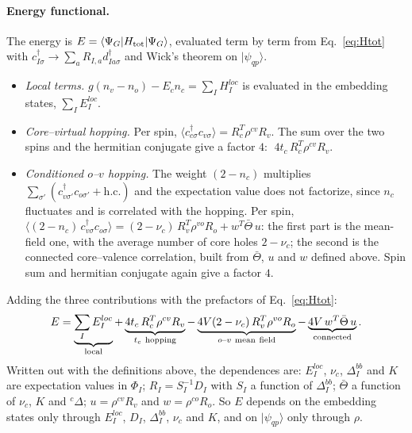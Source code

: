 \documentclass[11pt]{article}
\newcommand{\dg}{^{\dagger}}
\newcommand{\ket}[1]{|#1\rangle}
\newcommand{\braket}[1]{\langle #1\rangle}
\begin{document}
\paragraph{Energy functional.} The energy is $E=\braket{\Psi_G|H_{\rm tot}|\Psi_G}$, evaluated term by term from Eq.~\eqref{eq:Htot}
with $c\dg_{I\sigma}\to\sum_aR_{I,a}d\dg_{Ia\sigma}$ and Wick's theorem on $\ket{\psi_{qp}}$.
\begin{itemize}
\item \emph{Local terms.} $g(n_v-n_o)-E_cn_c=\sum_IH^{loc}_I$ is evaluated in the embedding states, $\sum_IE^{loc}_I$.
\item \emph{Core--virtual hopping.} Per spin, $\braket{c\dg_{c\sigma}c_{v\sigma}}=R_c^T\rho^{cv}R_v$. The sum over the two spins and the
hermitian conjugate give a factor $4$: $\;4t_c\,R_c^T\rho^{cv}R_v$.
\item \emph{Conditioned $o$--$v$ hopping.} The weight $(2-n_c)$ multiplies $\sum_{\sigma'}(c\dg_{v\sigma'}c_{o\sigma'}+\mathrm{h.c.})$ and the expectation
value does not factorize, since $n_c$ fluctuates and is correlated with the hopping. Per spin,
$\braket{(2-n_c)\,c\dg_{v\sigma}c_{o\sigma}}=(2-\nu_c)\,R_v^T\rho^{vo}R_o+w^T\bar\Theta\,u$: the first part is the mean-field one, with the average
number of core holes $2-\nu_c$; the second is the connected core--valence correlation, built from $\bar\Theta$, $u$ and $w$ defined above.
Spin sum and hermitian conjugate again give a factor $4$.
\end{itemize}
Adding the three contributions with the prefactors of Eq.~\eqref{eq:Htot}:
\begin{equation}
E=\underbrace{\sum_IE^{loc}_I}_{\rm local}+\underbrace{4t_c\,R_c^T\rho^{cv}R_v}_{t_c\ \rm hopping}
-\underbrace{4V(2-\nu_c)\,R_v^T\rho^{vo}R_o}_{o\text{--}v\ \rm mean\ field}-\underbrace{4V\,w^T\bar\Theta\,u}_{\rm connected}.
\label{eq:E}
\end{equation}
Written out with the definitions above, the dependences are: $E^{loc}_I$, $\nu_c$, $\Delta^{bb}_I$ and $K$ are expectation values in
$\Phi_I$; $R_I=S_I^{-1}D_I$ with $S_I$ a function of $\Delta^{bb}_I$; $\bar\Theta$ a function of $\nu_c$, $K$ and ${}^c\Delta$;
$u=\rho^{cv}R_v$ and $w=\rho^{co}R_o$. So $E$ depends on the embedding states only through $E^{loc}_I$, $D_I$, $\Delta^{bb}_I$, $\nu_c$ and
$K$, and on $\ket{\psi_{qp}}$ only through $\rho$.
\end{document}
